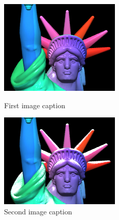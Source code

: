 \documentclass{article}
\begin{document}
\begin{itemize}
\begin{figure}[h]
  \centering
  \begin{minipage}{0.45\textwidth}
      \centering
      \includegraphics[width=\textwidth]{images/HeadManualWithoutSnow.png}
      \caption{First image caption}
      \label{fig:image1}
  \end{minipage}\hfill
  \begin{minipage}{0.45\textwidth}
      \centering
      \includegraphics[width=\textwidth]{images/HeadManualWithSnow.png}
      \caption{Second image caption}
      \label{fig:image2}
  \end{minipage}
\end{figure}




\end{itemize}
\end{document}

